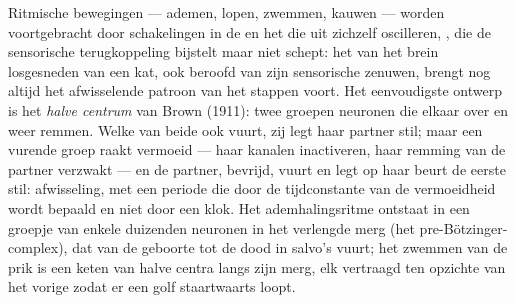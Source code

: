 \begin{proposition}\label{prop:b3:nervous-systems:cpg}
Ritmische bewegingen --- ademen, lopen, zwemmen, kauwen --- worden
voortgebracht door schakelingen in de  en het  die
uit zichzelf oscilleren, \emph{}, die de
sensorische terugkoppeling bijstelt maar niet schept: het van het brein
losgesneden  van een kat, ook beroofd van zijn sensorische
zenuwen, brengt nog altijd het afwisselende patroon van het stappen
voort. Het eenvoudigste ontwerp is het \emph{halve centrum} van Brown
(1911): twee groepen neuronen die elkaar over en weer remmen. Welke van
beide ook vuurt, zij legt haar partner stil; maar een vurende groep
raakt vermoeid --- haar kanalen inactiveren, haar remming van de
partner verzwakt --- en de partner, bevrijd, vuurt en legt op haar
beurt de eerste stil: afwisseling, met een periode die door de
tijdconstante van de vermoeidheid wordt bepaald en niet door een klok.
Het ademhalingsritme ontstaat in een groepje van enkele duizenden
neuronen in het verlengde merg (het pre-Bötzinger-complex), dat van de
geboorte tot de dood in salvo's vuurt; het zwemmen van de prik is een
keten van halve centra langs zijn merg, elk vertraagd ten opzichte van
het vorige zodat er een golf staartwaarts loopt.
\end{proposition}

